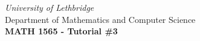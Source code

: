 \documentclass[12pt]{article}
\newcommand{\skipline}{\vspace{12pt}}
\begin{document}
\author{Instructor: Sean Fitzpatrick}
\thispagestyle{empty}
\begin{center}
\emph{University of Lethbridge}\\
Department of Mathematics and Computer Science\\
{\bf MATH 1565 - Tutorial \#3}\\
\end{center}



\vspace{0.1in}

\vspace*{\fill}
\end{document}
